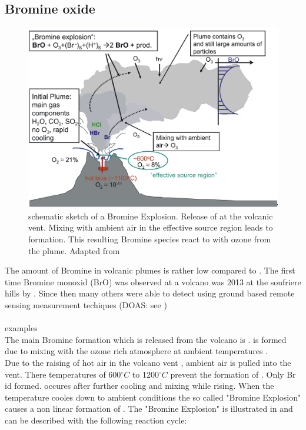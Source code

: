 \documentclass  [
  paper    = a4,
  BCOR     = 10mm,
  twoside,
  fontsize = 12pt,
  fleqn,
  toc      = bibnumbered,
  toc      = listofnumbered,
  numbers  = noendperiod,
  headings = normal,
  listof   = leveldown,
  version  = 3.03
]                                       {scrreprt}
\begin{document}
\subsection{Bromine oxide}
\begin{figure}
	\centering
	\includegraphics[width=0.7\linewidth]{Bilder/Simon/Bilder_Tung/BrO_Plume}
	\caption{schematic sketch of a Bromine Explosion.
		Release of  at the volcanic vent. Mixing with ambient air in the effective source region leads to  formation. This resulting Bromine species react to  with ozone from the plume. Adapted from \cite{bobrowski2007reactive}}
	\label{fig:broplume}
\end{figure}
The amount of Bromine in volcanic plumes is rather low compared to   \cite{Bobrowski 2013}. The first time Bromine monoxid (BrO) was observed at a volcano was 2013 at the soufriere hills by \cite{Bobrowski 2013}. Since then many others were able to detect   using ground based remote sensing measurement techiques (DOAS: see )\\
\\
examples
\\
The main Bromine formation which is released from the volcano is  .   is formed due to mixing with the ozone rich atmosphere at ambient temperatures \cite{bobrowski2007reactive}.\\
Due to the raising of hot air in the volcano vent , ambient air is pulled into the vent. There temperatures of  600$^{\circ}C$ to 1200$^{\circ}C$    prevent the formation of . Only Br id formed.   occures after further cooling and mixing while rising. When the temperature cooles down to ambient conditions the so called "Bromine Explosion" causes a non linear formation of .
The "Bromine Explosion" is illustrated in  and can be described with the following reaction cycle:
\end{document}
